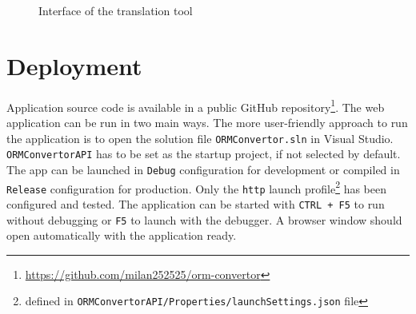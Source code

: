 \begin{figure}[!htp]
  \centering
  \caption{Interface of the translation tool}
  \label{fig:tool_interface}
\end{figure}


\section{Deployment}
Application source code is available in a public GitHub repository\footnote{\url{https://github.com/milan252525/orm-convertor}}. The web application can be run in two main ways. The more user-friendly approach to run the application is to open the solution file \texttt{ORMConvertor.sln} in Visual Studio. \texttt{ORMConvertorAPI} has to be set as the startup project, if not selected by default. The app can be launched in \texttt{Debug} configuration for development or compiled in \texttt{Release} configuration for production. Only the \texttt{http} launch profile\footnote{defined in \texttt{ORMConvertorAPI/Properties/launchSettings.json} file} has been configured and tested. The application can be started with \texttt{CTRL + F5} to run without debugging or \texttt{F5} to launch with the debugger. A browser window should open automatically with the application ready.

